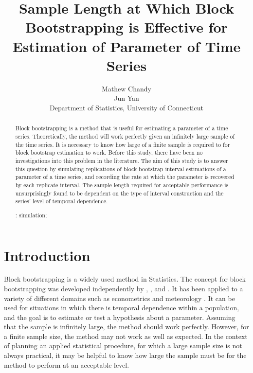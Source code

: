 \documentclass[12pt, letterpaper, titlepage]{article}
\title{Sample Length at Which Block Bootstrapping is Effective for Estimation of Parameter of Time Series}
\author{Mathew Chandy\\
  Jun Yan\\[1ex]
  Department of Statistics, University of Connecticut\\
}
\date{}
\begin{document}
 
\maketitle

\doublespace

\begin{abstract}
Block bootstrapping is a method that is useful for estimating a parameter of a time
series. Theoretically, the method will work perfectly given an infinitely large sample of the time series.
It is necessary to know how large of a finite sample is required to for block bootstrap estimation to work. Before this study, there have been no investigations into this problem in the literature. The aim of this study is to answer this question by simulating replications of block bootstrap interval estimations of a parameter of a time series, and recording the rate at which the parameter is recovered by each replicate interval. The sample length required for acceptable performance is unsurprisingly found to be dependent on the type of interval construction and the series' level of temporal dependence.


\bigskip
\noindent{}:
simulation;
\end{abstract}

\section{Introduction}
\label{sec:intro}

Block bootstrapping is a widely used method in Statistics. The concept for block 
bootstrapping was developed independently by \citet{hall1985resampling}, \citet{carlstein1986use}, and 
\citet{kunsch1989jackknife}. \citet{radovanov2014comparison} It has been applied to a variety of 
different domains such 
as econometrics \citep{mackinnon2006bootstrap} and meteorology \citep{varga2017generalised}. It can be used for 
situations in which there is temporal dependence within a population, and the goal is to estimate or test a hypothesis about a parameter. Assuming that the sample is infinitely 
large, the method should work perfectly. However, for a finite sample size, the method may 
not work as well as expected. In the context of planning an applied 
statistical procedure, for which a large sample size is not always practical, it may be helpful to know how large the sample must be for the method to perform at an acceptable level. 
\end{document}
